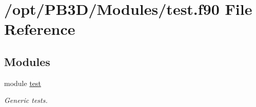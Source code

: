 \hypertarget{test_8f90}{}\section{/opt/\+P\+B3\+D/\+Modules/test.f90 File Reference}
\label{test_8f90}
\subsection*{Modules}
\begin{DoxyCompactItemize}
\item 
module \hyperlink{namespacetest}{test}
\begin{DoxyCompactList}\small\item\em Generic tests. \end{DoxyCompactList}\end{DoxyCompactItemize}
